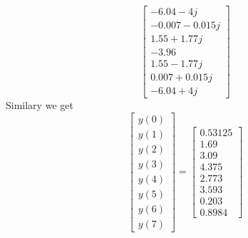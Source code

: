 \documentclass[journal,12pt,twocolumn]{IEEEtran}
\renewcommand\thesection{\arabic{section}}
\begin{document}
\begin{enumerate}[label=\thesection.\arabic*.,ref=\thesection.\theenumi]
\begin{equation}
\begin{bmatrix}
-6.04 - 4j \\
-0.007-0.015j \\
1.55 +1.77j \\
-3.96 \\
1.55 -1.77j\\
0.007+0.015j  \\
-6.04 + 4j
\end{bmatrix}
\end{equation}
Similary we get
\begin{equation}
\begin{bmatrix}
y(0) \\
y(1) \\
y(2) \\
y(3) \\
y(4) \\
y(5) \\
y(6) \\
y(7)
\end{bmatrix}
=
\begin{bmatrix}
0.53125 \\
1.69 \\
3.09 \\
4.375 \\
2.773\\
3.593\\
0.203\\
0.8984
\end{bmatrix}
\end{equation}
\end{enumerate}
\end{document}
